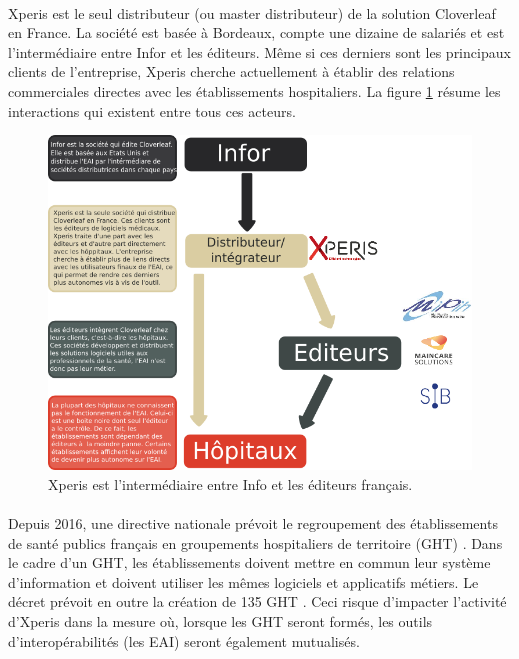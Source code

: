 			\paragraph{}
			Xperis est le seul distributeur (ou master distributeur) de la solution
			Cloverleaf en France. La société est basée à Bordeaux, compte une dizaine de
			salariés et est l'intermédiaire entre Infor et les éditeurs.
			Même si ces derniers sont les principaux clients de l'entreprise,
			Xperis cherche actuellement à établir des relations commerciales
			directes avec les établissements hospitaliers.\newline
			La figure \ref{xperis_secteur} résume les interactions qui existent entre
			tous ces acteurs.
			\begin{figure}[H]%
				\centering
				\includegraphics[width=17cm]{../img/xperis_secteur.png}
				\caption{\label{xperis_secteur} Xperis est l'intermédiaire entre Info et
				les éditeurs français.}
			\end{figure}
			
			\paragraph{}%
			Depuis 2016, une directive nationale prévoit le regroupement des établissements de 
			santé publics français en groupements hospitaliers de territoire (GHT) 
			\citep{valls_decret_2016}. Dans le cadre d'un GHT, les établissements doivent mettre 
			en commun leur système d'information et doivent utiliser les mêmes logiciels et 
			applicatifs métiers. Le décret prévoit en outre la création de 135 GHT  
			\citep{touraine_marisol_2016}. Ceci risque d'impacter l'activité d'Xperis dans la 
			mesure où, lorsque les GHT seront formés, les outils d'interopérabilités 
			(les EAI) seront également mutualisés.
			
